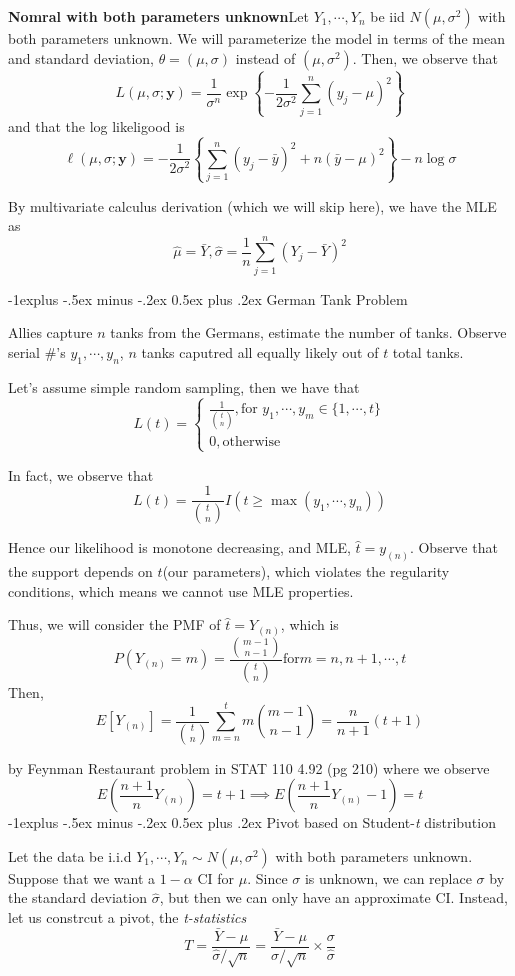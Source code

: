\documentclass[10pt,landscape]{article}
\makeatletter
\renewcommand{\subsection}{\@startsection{subsection}{2}{0mm}%
                                {-1explus -.5ex minus -.2ex}%
                                {0.5ex plus .2ex}%
                                {\normalfont\normalsize\bfseries}}
\makeatother
\begin{document}
\begin{multicols*}{3}
\textbf{Nomral with both parameters unknown}Let $Y_1, \cdots, Y_n$ be iid $N(\mu, \sigma^2)$ with both parameters unknown. We will parameterize the model in terms of the mean and standard deviation, $\theta=(\mu,\sigma)$ instead of $(\mu,\sigma^2)$. Then, we observe that $$L(\mu,\sigma;\textbf{y}) =\frac{1}{\sigma^n} \exp \left\{-\frac{1}{2\sigma^2} \sum_{j=1}^n (y_j-\mu)^2 \right\}$$
and that the log likeligood is $$\ell(\mu,\sigma;\textbf{y}) = -\frac{1}{2\sigma^2} \left\{ \sum_{j=1}^n (y_j-\bar{y})^2 + n(\bar{y}-\mu)^2\right\} -n\log \sigma$$

By multivariate calculus derivation (which we will skip here), we have the MLE as $$\hat{\mu}=\bar{Y}, \hat{\sigma}=\frac{1}{n}\sum_{j=1}^n (Y_j-\bar{Y})^2$$

\subsection{German Tank Problem}

Allies capture $n$ tanks from the Germans, estimate the number of tanks. Observe serial \#'s $y_1, \cdots, y_n$, $n$ tanks caputred all equally likely out of $t$ total tanks.

Let's assume simple random sampling, then we have that $$L(t) = \begin{cases}
\frac{1}{{t \choose n}}, \text{for } y_1, \cdots, y_m \in \{1, \cdots, t\}\\
0, \text{otherwise}
\end{cases}$$

In fact, we observe that $$L(t)= \frac{1}{{t \choose n}} I(t \geq \max(y_1, \cdots, y_n))$$

Hence our likelihood is monotone decreasing, and MLE, $\hat{t}=y_{(n)}$. Observe that the support depends on $t$(our parameters), which violates the regularity conditions, which means we cannot use MLE properties.

Thus, we will consider the PMF of $\hat{t}=Y_{(n)}$, which is $$P(Y_{(n)}=m)=\frac{{m-1\choose n-1}}{{t\choose n}} \text{for} m=n, n+1, \cdots, t$$
Then, $$E[Y_{(n)}] = \frac{1}{{t\choose n}} \sum_{m=n}^t m{m-1\choose n-1} = \frac{n}{n+1}(t+1)$$

by Feynman Restaurant problem in STAT 110 4.92 (pg 210) where we observe $$E\left(\frac{n+1}{n}Y_{(n)}\right) = t+1 \implies E\left(\frac{n+1}{n} Y_{(n)}-1\right) = t$$
\subsection{Pivot based on Student-\emph{t} distribution}

Let the data be i.i.d $Y_1, \cdots, Y_n \sim N(\mu, \sigma^2)$ with both parameters unknown. Suppose that we want a $1-\alpha$ CI for $\mu$. Since $\sigma$ is unknown, we can replace $\sigma$ by the standard deviation $\hat{\sigma}$, but then we can only have an approximate CI. Instead, let us constrcut a pivot, the \emph{t-statistics} $$T=\frac{\bar{Y}-\mu}{\hat{\sigma}/\sqrt{n}} = \frac{\bar{Y}-\mu}{\sigma/\sqrt{n}} \times \frac{\sigma}{\hat{\sigma}}$$

\end{multicols*}
\end{document}
